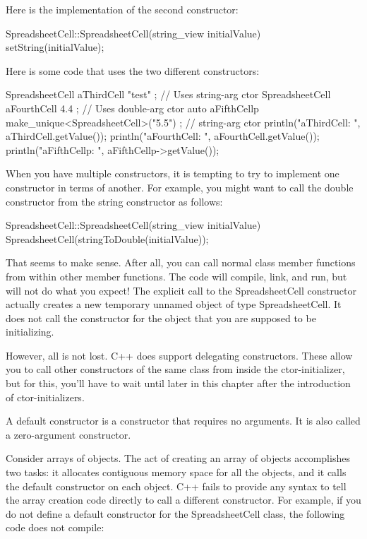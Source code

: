 Here is the implementation of the second constructor:

\begin{cpp}
SpreadsheetCell::SpreadsheetCell(string_view initialValue)
{
    setString(initialValue);
}
\end{cpp}

Here is some code that uses the two different constructors:

\begin{cpp}
SpreadsheetCell aThirdCell { "test" }; // Uses string-arg ctor
SpreadsheetCell aFourthCell { 4.4 }; // Uses double-arg ctor
auto aFifthCellp { make_unique<SpreadsheetCell>("5.5") }; // string-arg ctor
println("aThirdCell: {}", aThirdCell.getValue());
println("aFourthCell: {}", aFourthCell.getValue());
println("aFifthCellp: {}", aFifthCellp->getValue());
\end{cpp}

When you have multiple constructors, it is tempting to try to implement one constructor in terms of another. For example, you might want to call the double constructor from the string constructor as follows:

\begin{cpp}
SpreadsheetCell::SpreadsheetCell(string_view initialValue)
{
    SpreadsheetCell(stringToDouble(initialValue));
}
\end{cpp}

That seems to make sense. After all, you can call normal class member functions from within other member functions. The code will compile, link, and run, but will not do what you expect! The explicit call to the SpreadsheetCell constructor actually creates a new temporary unnamed object of type SpreadsheetCell. It does not call the constructor for the object that you are supposed to be initializing.

However, all is not lost. C++ does support delegating constructors. These allow you to call other constructors of the same class from inside the ctor-initializer, but for this, you’ll have to wait until later in this chapter after the introduction of ctor-initializers.


A default constructor is a constructor that requires no arguments. It is also called a zero-argument constructor.


Consider arrays of objects. The act of creating an array of objects accomplishes two tasks: it allocates contiguous memory space for all the objects, and it calls the default constructor on each object. C++ fails to provide any syntax to tell the array creation code directly to call a different constructor. For example, if you do not define a default constructor for the SpreadsheetCell class, the following code does not compile:

